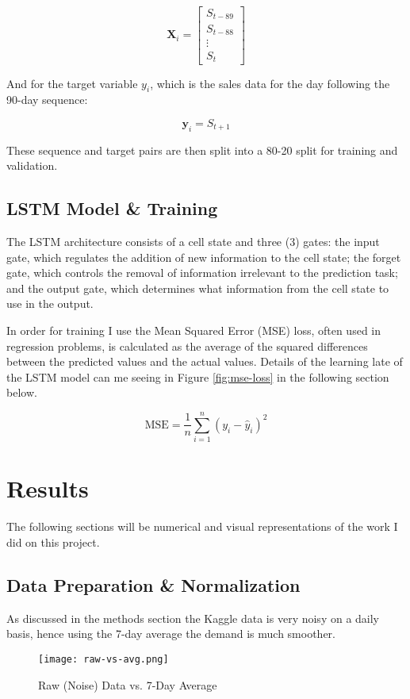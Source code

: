 \documentclass[10pt, journal, letterpaper, compsoc]{IEEEtran}
\begin{document}
$$
\mathbf{X}_i = \begin{bmatrix} 
S_{t-89} \\ 
S_{t-88} \\ 
\vdots \\ 
S_t 
\end{bmatrix}
$$

And for the target variable $y_i$, which is the sales data for the day following the 90-day sequence:

$$
\mathbf{y}_i = S_{t+1}
$$

These sequence and target pairs are then split into a 80-20 split for training and validation.


\subsection{LSTM Model \& Training}
The LSTM architecture consists of a cell state and three (3) gates: the input gate, which regulates the addition of new information to the cell state; the forget gate, which controls the removal of information irrelevant to the prediction task; and the output gate, which determines what information from the cell state to use in the output.

In order for training I use the Mean Squared Error (MSE) loss, often used in regression problems\cite{improved-sales-forecasting}, is calculated as the average of the squared differences between the predicted values and the actual values. Details of the learning late of the LSTM model can me seeing in Figure \ref{fig:mse-loss} in the following section below.

$$
\text{MSE} = \frac{1}{n} \sum_{i=1}^{n} (y_i - \hat{y}_i)^2
$$


\section{Results}
The following sections will be numerical and visual representations of the work I did on this project.

\subsection{Data Preparation \& Normalization}
As discussed in the methods section the Kaggle data is very noisy on a daily basis, hence using the 7-day average the demand is much smoother.

\begin{figure}[h]
\centering
\captionsetup{justification=centering,margin=1cm}
\texttt{[image: raw-vs-avg.png]}
\caption{Raw (Noise) Data vs. 7-Day Average}
\label{fig:raw-vs-avg}
\end{figure}
\end{document}
